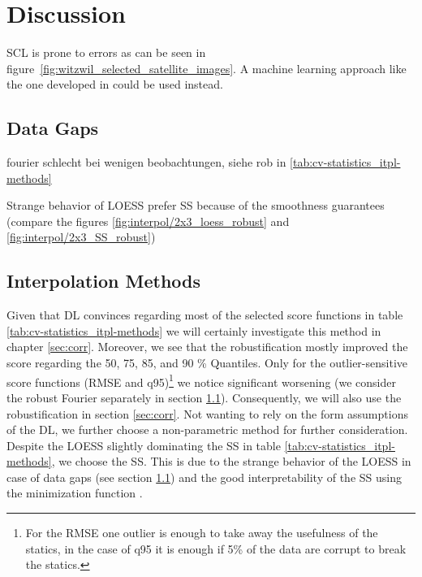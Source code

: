 \chapter{Discussion}

    SCL is prone to errors as can be seen in figure~\ref{fig:witzwil_selected_satellite_images}. A machine learning approach like the one developed in \cite{raiyaniSentinel2ImageScene2021} could be used instead.

\section{Data Gaps}\label{sec:discussion_itpl_data_gaps}
fourier schlecht bei wenigen beobachtungen, siehe rob in \ref{tab:cv-statistics_itpl-methods}

Strange behavior of LOESS 
prefer SS because of the smoothness guarantees (compare the figures \ref{fig:interpol/2x3_loess_robust} and \ref{fig:interpol/2x3_SS_robust})

\section{Interpolation Methods}{ \label{sec:discussion_itpl}Given that DL convinces regarding most of the selected score functions in table \ref{tab:cv-statistics_itpl-methods} we will certainly investigate this method in chapter \ref{sec:corr}. Moreover, we see that the robustification mostly improved the score regarding the 50, 75, 85, and 90 \% Quantiles. Only for the outlier-sensitive score functions (RMSE and q95)\footnote{For the RMSE one outlier is enough to take away the usefulness of the statics, in the case of q95 it is enough if 5\% of the data are corrupt to break the statics.} we notice significant worsening (we consider the robust Fourier separately in section \ref{sec:discussion_itpl_data_gaps}). Consequently, we will also use the robustification in section \ref{sec:corr}.
Not wanting to rely on the form assumptions of the DL, we further choose a non-parametric method for further consideration. Despite the LOESS slightly dominating the SS in table \ref{tab:cv-statistics_itpl-methods}, we choose the SS. This is due to the strange behavior of the LOESS in case of data gaps (see section \ref{sec:discussion_itpl_data_gaps}) and the good interpretability of the SS using the minimization function .



}

